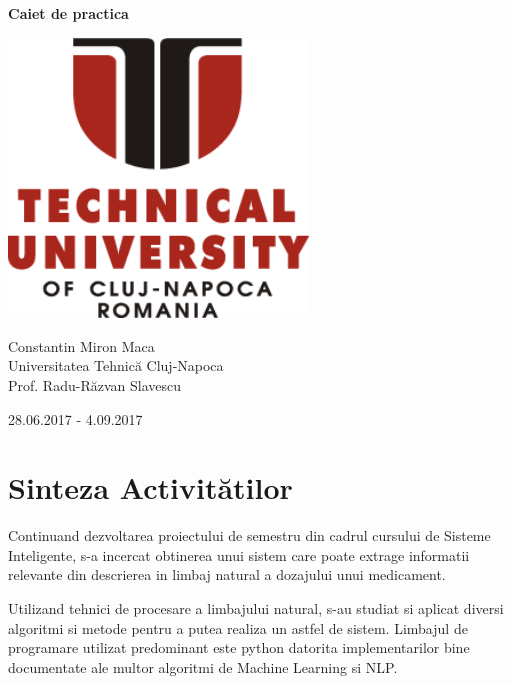 \documentclass[a4paper,12pt]{article}
\begin{document}
\begin{titlepage}
\centering
    \vspace*{\fill}

    \Huge\bfseries
    Caiet de practica

    \vspace*{1.5cm}
	\includegraphics[width=8cm]{university_logo.png}
	\vspace*{0.5cm}

    \large {Constantin Miron Maca\\ 
    Universitatea Tehnic{\u a} Cluj-Napoca\\
    Prof. Radu-R{\u a}zvan Slavescu\\}
	
	\vspace*{1.5cm}
	\normalsize{28.06.2017 - 4.09.2017}

    \vspace*{\fill}
    
    \end{titlepage}

\tableofcontents{}
\clearpage

\section{Sinteza Activi{\cb t}{\u a}tilor}

 Continuand dezvoltarea proiectului de semestru din cadrul cursului de Sisteme Inteligente, s-a incercat obtinerea unui sistem care poate extrage informatii relevante din descrierea in limbaj natural a dozajului unui medicament. 
 
 Utilizand tehnici de procesare a limbajului natural, s-au studiat si aplicat diversi algoritmi si metode pentru a putea realiza un astfel de sistem. Limbajul de programare utilizat predominant este python datorita implementarilor bine documentate ale multor algoritmi de Machine Learning si NLP.
 
\end{document}
